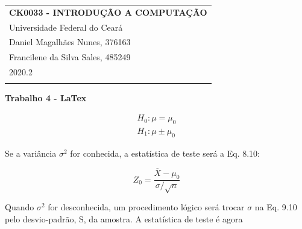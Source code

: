 \documentclass[a4paper,12pt]{article} %
\begin{document}
	
	
	\thispagestyle{empty} %
	
	\begin{tabular}{p{15.5cm}} %
		{\large \bf CK0033 - INTRODUÇÃO A COMPUTAÇÃO} \\
		 Universidade Federal do Ceará \\ 
		 Daniel Magalhães Nunes, 376163 \\
		 Francilene da Silva Sales, 485249 \\ 2020.2 \\
		\hline %
		\\
	\end{tabular} %
	
	\vspace*{0.3cm} %
	
	\begin{center} %
		{\Large \bf Trabalho 4 - LaTex} %
		\vspace{2mm}
		
	\end{center}  

	\vspace{0.4cm}
	
	\begin{align*}
			H_0: \mu = \mu_0 \\
			H_1: \mu \pm \mu_0
	\end{align*}

	Se a variância $\sigma^2$ for conhecida, a estatística de teste será a Eq. 8.10:
	
	\begin{equation*}
		Z_0 = \frac{\overline{X} - \mu_0}{\sigma / \sqrt{n}}
	\end{equation*}

	Quando $\sigma^2$ for desconhecida, um procedimento lógico será trocar $\sigma$ na Eq. 9.10 pelo desvio-padrão, S, da amostra. A estatística de teste é agora
	
\end{document}
